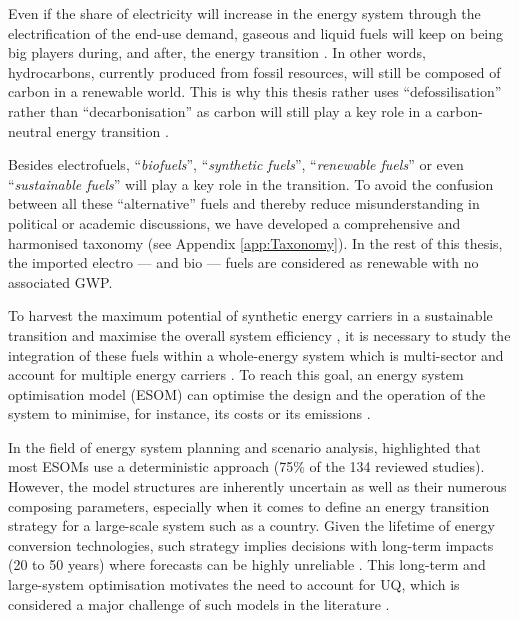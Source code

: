 Even if the share of electricity will increase in the energy system through the electrification of the end-use demand, gaseous and liquid fuels will keep on being big players during, and after, the energy transition \cite{Ahlgren2012}. In other words, hydrocarbons, currently produced from fossil resources, will still be composed of carbon in a renewable world. This is why this thesis rather uses ``defossilisation'' rather than ``decarbonisation'' as carbon will still play a key role in a carbon-neutral energy transition \cite{mertens2020carbon}. 

Besides electrofuels, ``\emph{biofuels}'', ``\emph{synthetic fuels}'', ``\emph{renewable fuels}'' or even ``\emph{sustainable fuels}'' will play a key role in the transition. To avoid the confusion between all these ``alternative'' fuels and thereby reduce misunderstanding in political or academic discussions, we have developed a comprehensive and harmonised taxonomy (see Appendix \ref{app:Taxonomy}).  In the rest of this thesis, the imported electro --- and bio --- fuels are considered as renewable with no associated \gls{GWP}. 

To harvest the maximum potential of synthetic energy carriers in a sustainable transition and maximise the overall system efficiency \cite{mathiesen2015}, it is necessary to study the integration of these fuels within a whole-energy system which is multi-sector and account for multiple energy carriers \cite{contino2020whole}. To reach this goal, an energy system optimisation model (ESOM) can optimise the design and the operation of the system to minimise, for instance, its costs or its emissions \cite{zeng2011review}. 

In the field of energy system planning and scenario analysis, \citet{yue2018review} highlighted that most ESOMs use a deterministic approach (75\% of the 134 reviewed studies). However, the model structures are inherently uncertain as well as their numerous composing parameters, especially when it comes to define an energy transition strategy for a large-scale system such as a country. Given the lifetime of energy conversion technologies, such strategy implies decisions with long-term impacts (20 to 50 years) where forecasts can be highly unreliable \cite{Moret2017}. This long-term and large-system optimisation motivates the need to account for \gls{UQ}, which is considered a major challenge of such models in the literature \cite{pfenninger2014energy}. %

